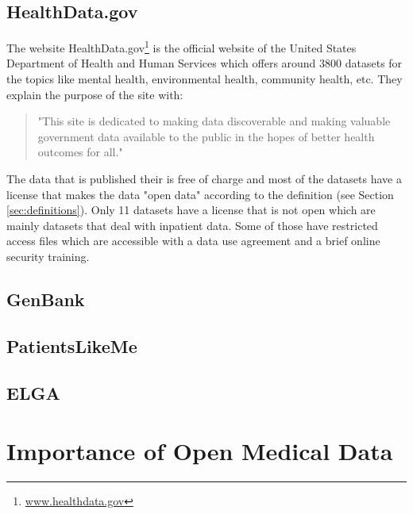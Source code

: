 \documentclass[a4paper, 11pt]{article}
\begin{document}
\subsection{HealthData.gov}
The website HealthData.gov\footnote{\url{www.healthdata.gov}} is the official website of the United States Department of Health and Human Services which offers around 3800 datasets for the topics like mental health, environmental health, community health, etc. They explain the purpose of the site with:  
\begin{quote}
    "This site is dedicated to making data discoverable and making valuable government data available to the public in the hopes of better health outcomes for all."\cite{HealthDataGov}
\end{quote}
The data that is published their is free of charge and most of the datasets have a license that makes the data "open data" according to the definition (see Section \ref{sec:definitions}). Only 11 datasets have a license that is not open which are mainly datasets that deal with inpatient data. Some of those have restricted access files which are accessible with a data use agreement and a brief online security training. \cite{HealthDataGov}

\subsection{GenBank}

\subsection{PatientsLikeMe}

\subsection{ELGA}

\section{Importance of Open Medical Data}\label{sec:importance}

\end{document}
